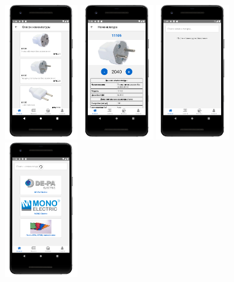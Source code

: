 \begin{figure}[!htb]
\begin{minipage}{0.16\textwidth}
        \includegraphics[height=5.8cm]
        {images/mobile/items/items.png}
    \end{minipage}
    \begin{minipage}{0.16\textwidth}
        \centering

        \includegraphics[height=5.8cm]
        {images/mobile/items/item.png}
    \end{minipage}
    \begin{minipage}{0.16\textwidth}
        \centering

        \includegraphics[height=5.8cm]
        {images/mobile/items/no-internet.png}
    \end{minipage}
    \begin{minipage}{0.16\textwidth}
        \centering

        \includegraphics[height=5.8cm]
        {images/mobile/items/spin.png}
    \end{minipage}
  

\end{figure}
